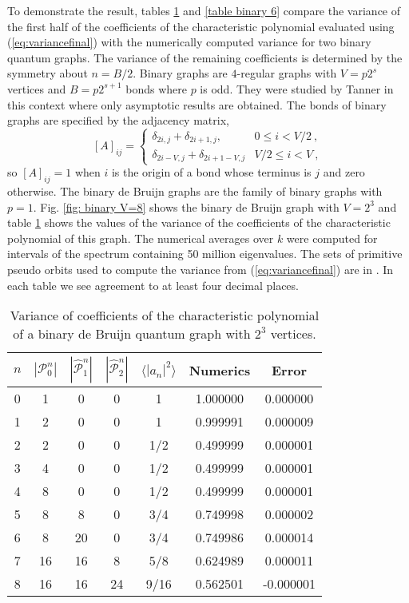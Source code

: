 \documentclass[doublecol]{epl2}
\begin{document}
To demonstrate the result, tables \ref{Table binary 8} and \ref{table binary 6} compare the variance of the first half of the coefficients of the characteristic polynomial evaluated using (\ref{eq:variancefinal}) with the numerically computed variance for two binary quantum graphs.  The variance of the remaining coefficients is determined by the symmetry about $n=B/2$.
Binary graphs are $4$-regular graphs { with $V=p2^s$ vertices and $B=p2^{s+1}$ bonds} where $p$ is odd.  They were studied by Tanner in this context \cite{T00,T01,T02} where only asymptotic results are obtained.   The bonds of binary graphs are specified by the adjacency matrix,
\begin{equation} 
\label{qnaryadjacency}
[A]_{ij} = 
\begin{cases} 
\delta_{2i,j}+\delta_{2i+1,j}, & 0\leq i <V/2 \ ,\\
\delta_{2i-V,j}+\delta_{2i+1-V,j} & V/2 \leq i < V  \ ,
\end{cases}
\end{equation}
so $[A]_{ij}=1$ when $i$ is the origin of a bond whose terminus is $j$ and zero otherwise. The binary de Bruijn graphs are the family of binary graphs with $p=1$. Fig. \ref{fig: binary V=8} shows the binary de Bruijn graph with $V=2^3$ and table \ref{Table binary 8} shows the values of the variance of the coefficients of the characteristic polynomial of this graph. 
The numerical averages over $k$ were computed for intervals of the spectrum containing 50 million eigenvalues.  
The sets of primitive pseudo orbits used to compute the variance from (\ref{eq:variancefinal}) are in \cite{HH20}.  In each table we see agreement to at least four decimal places.

\begin{table}[htbp!]
	\caption{Variance of coefficients of the characteristic polynomial of a binary de Bruijn quantum graph with $2^3$ vertices.}
	\label{Table binary 8}
	\begin{center}{\small
	\begin{tabular}{ c c c c c c c }
		$n$ & $|\mathcal{P}_0^n|$ & $|\widehat{\mathcal{P}}_{1}^n|$ 
		& $|\widehat{\mathcal{P}}_{2}^n|$ & $\langle |a_n|^2 \rangle$ 
		& Numerics & Error \\
		\hline
		0 & 1 & 0 & 0 & 1 & 1.000000 & 0.000000 \\
		1 & 2 & 0 & 0 & 1 & 0.999991 & 0.000009 \\
		2 & 2 & 0 & 0 & 1/2 & 0.499999 & 0.000001 \\
		3 & 4 & 0 & 0 & 1/2 & 0.499999 & 0.000001 \\
		4 & 8 & 0 & 0 & 1/2 & 0.499999 & 0.000001 \\
		5 & 8 & 8 & 0 & 3/4 & 0.749998 & 0.000002 \\
		6 & 8 & 20 & 0 & 3/4 & 0.749986 & 0.000014 \\
		7 & 16 & 16 & 8 & 5/8 & 0.624989 & 0.000011 \\
		8 & 16 & 16 & 24 & 9/16 & 0.562501 & -0.000001 \\
		\hline
	\end{tabular}}
\end{center}
\end{table}
\end{document}
